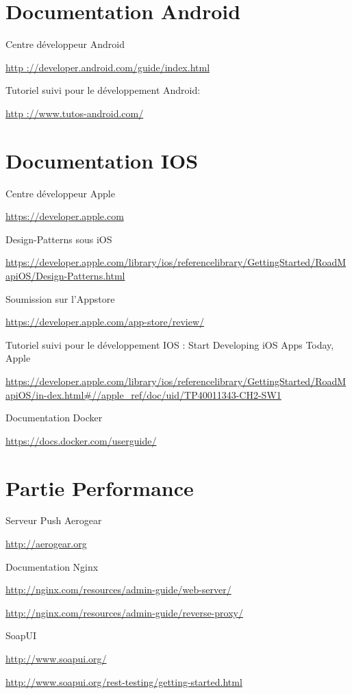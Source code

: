 \section{Documentation Android}

Centre développeur Android

\url{http ://developer.android.com/guide/index.html}

Tutoriel suivi pour le développement Android:

\url{http ://www.tutos-android.com/}

\section{Documentation IOS}

Centre développeur Apple 

\url{https://developer.apple.com}

Design-Patterns sous iOS 

\url{https://developer.apple.com/library/ios/referencelibrary/GettingStarted/RoadMapiOS/Design-Patterns.html}

Soumission sur l’Appstore 

\url{https://developer.apple.com/app-store/review/}

Tutoriel suivi pour le développement IOS :
Start Developing iOS Apps Today, Apple 

\url{https://developer.apple.com/library/ios/referencelibrary/GettingStarted/RoadMapiOS/in-dex.html#//apple_ref/doc/uid/TP40011343-CH2-SW1}

Documentation Docker

\url{https://docs.docker.com/userguide/}

\section{Partie Performance}

Serveur Push Aerogear 

\url{http://aerogear.org}

Documentation Nginx

\url{http://nginx.com/resources/admin-guide/web-server/}

\url{http://nginx.com/resources/admin-guide/reverse-proxy/}

SoapUI

\url{http://www.soapui.org/}

\url{http://www.soapui.org/rest-testing/getting-started.html}

